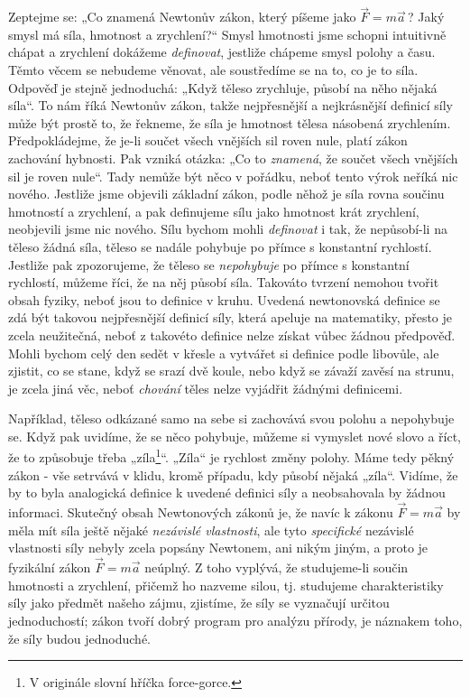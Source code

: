     Zeptejme se: „Co znamená Newtonův zákon, který píšeme jako \(\vec{F}=m \vec{a}\,\)? Jaký smysl 
    má síla, hmotnost a zrychlení?“ Smysl hmotnosti jsme schopni intuitivně chápat a zrychlení 
    dokážeme \emph{definovat}, jestliže chápeme smysl polohy a času. Těmto věcem se nebudeme 
    věnovat, ale soustředíme se na to, co je to síla. Odpověď je stejně jednoduchá: „Když těleso 
    zrychluje, působí na něho nějaká síla“. To nám říká Newtonův zákon, takže nejpřesnější a 
    nejkrásnější definicí síly může být prostě to, že řekneme, že síla je hmotnost tělesa násobená 
    zrychlením. Předpokládejme, že je-li součet všech vnějších sil roven nule, platí zákon 
    zachování hybnosti. Pak vzniká otázka: „Co to \emph{znamená}, že součet všech vnějších sil je 
    roven nule“. Tady nemůže být něco v pořádku, neboť tento výrok neříká nic nového. Jestliže jsme 
    objevili základní zákon, podle něhož je síla rovna součinu hmotností a zrychlení, a pak 
    definujeme sílu jako hmotnost krát zrychlení, neobjevili jsme nic nového. Sílu bychom mohli 
    \emph{definovat} i tak, že nepůsobí-li na těleso žádná síla, těleso se nadále pohybuje po 
    přímce s konstantní rychlostí. Jestliže pak zpozorujeme, že těleso se \emph{nepohybuje} po 
    přímce s konstantní rychlostí, můžeme říci, že na něj působí síla. Takováto tvrzení nemohou 
    tvořit obsah fyziky, neboť jsou to definice v kruhu. Uvedená newtonovská definice se zdá být 
    takovou nejpřesnější definicí síly, která apeluje na matematiky, přesto je zcela neužitečná, 
    neboť z takovéto definice nelze získat vůbec žádnou předpověď. Mohli bychom celý den sedět v 
    křesle a vytvářet si definice podle libovůle, ale zjistit, co se stane, když se srazí dvě 
    koule, nebo když se závaží zavěsí na strunu, je zcela jiná věc, neboť \emph{chování} těles 
    nelze vyjádřit žádnými definicemi.
    
    Například, těleso odkázané samo na sebe si zachovává svou polohu a nepohybuje se. Když pak 
    uvidíme, že se něco pohybuje, můžeme si vymyslet nové slovo a říct, že to způsobuje třeba 
    „zíla\footnote{V originále slovní hříčka force-gorce.}“. „Zíla“ je rychlost změny polohy. Máme 
    tedy pěkný zákon - vše setrvává v klidu, kromě případu, kdy působí nějaká „zíla“. Vidíme, že by 
    to byla analogická definice k uvedené definici síly a neobsahovala by žádnou informaci. 
    Skutečný obsah Newtonových zákonů je, že navíc k zákonu \(\vec{F}= m\vec{a}\) by měla mít síla 
    ještě nějaké \emph{nezávislé vlastnosti}, ale tyto \emph{specifické} nezávislé vlastnosti síly 
    nebyly zcela popsány Newtonem, ani nikým jiným, a proto je fyzikální zákon \(\vec{F}= 
    m\vec{a}\) neúplný. Z toho vyplývá, že studujeme-li součin hmotnosti a zrychlení, přičemž ho 
    nazveme silou, tj. studujeme charakteristiky síly jako předmět našeho zájmu, zjistíme, že síly 
    se vyznačují určitou jednoduchostí; zákon tvoří dobrý program pro analýzu přírody, je náznakem 
    toho, že síly budou jednoduché.
    
